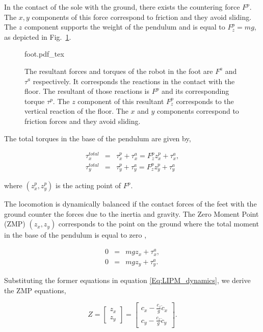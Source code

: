In the contact of the sole with the ground, there exists the countering force $F^p$. The $x,y$ components of this force correspond to friction and they avoid sliding. The $z$ component supports the weight of the pendulum and is equal to $F^p_z = mg$, as depicted in Fig.~\ref{Fig:Foot-Sole}.

\begin{figure}
  \centering
      {\def\svgwidth{0.5\columnwidth}
        
                   {foot.pdf_tex}}
      \caption[]{The resultant forces and torques of the robot in the foot are $F^a$ and $\tau^a$ respectively. It corresponds the reactions in the contact with the floor. The resultant of those reactions is $F^p$ and its corresponding torque $\tau^p$. The $z$ component of this resultant $F^p_z$ corresponds to the vertical reaction of the floor. The $x$ and $y$ components correspond to friction forces and they avoid sliding.}
      \label{Fig:Foot-Sole}
\end{figure}

The total torques in the base of the pendulum are given by,

\begin{eqnarray*}
\label{Eq:LIPM_total_torques}
\tau^{total}_{x} &=& \tau^p_x + \tau^a_x = F^p_z z^p_x + \tau^a_x, \\
\tau^{total}_{y} &=& \tau^p_y + \tau^a_y = F^p_z z^p_y + \tau^a_y
\end{eqnarray*}

\noindent where $(z^p_x, z^p_y)$ is the acting point of $F^p$.

The locomotion is dynamically balanced if the contact forces of the feet with the ground counter the forces due to the inertia and gravity. The Zero Moment Point (ZMP) $(z_x,z_y)$ corresponds to the point on the ground where the total moment in the base of the pendulum is equal to zero \citep{Vukobratovic1972,Vukobratovic2004},

\begin{eqnarray}
0 &=& m g z_x + \tau^a_x, \\
0 &=& m g z_y + \tau^a_y.
\end{eqnarray}

Substituting the former equations in equation \ref{Eq:LIPM_dynamics}, we derive the ZMP equations,

\begin{equation}
\label{Eq:LIPM_ZMP}
Z = 
\left[
\begin{matrix}
z_x \\ z_y
\end{matrix}
\right] = 
\left[
\begin{matrix}
c_x - \frac{c_z}{g}\ddot{c}_x \\ c_y - \frac{c_z}{g}\ddot{c}_y
\end{matrix}
\right].
\end{equation}

